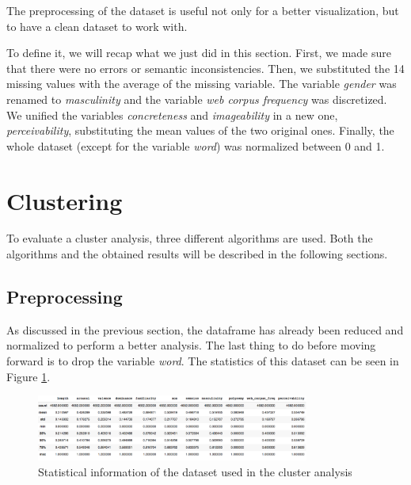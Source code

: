 \documentclass[a4paper,11pt,dvipsnames]{article}
\begin{document}
The preprocessing of the dataset is useful not only for a better visualization, but  to have a clean dataset to work with. 


To define it, we will recap what we just did in this section.
First, we made sure that there were no errors or semantic inconsistencies. Then, we substituted the 14 missing values with the average of the missing variable. The variable \textit{gender} was renamed to \textit{masculinity} and the variable \textit{web corpus frequency} was discretized. We unified the variables \textit{concreteness} and \textit{imageability} in a new one, \textit{perceivability}, substituting the mean values of the two original ones. Finally, the whole dataset (except for the variable \textit{word}) was normalized between 0 and 1.

\section{Clustering}

To evaluate a cluster analysis, three different algorithms are used. Both the algorithms and the obtained results will be described in the following sections.

\subsection{Preprocessing}
As discussed in the previous section, the dataframe has already been reduced and normalized to perform a better analysis. The last thing to do before moving forward is to drop the variable \textit{word}. The statistics of this dataset can be seen in Figure \ref{tab:stat2}.

\begin{figure}[h]
    \centering
    \includegraphics[width=0.8\textwidth]{stat2.png}
    \caption{Statistical information of the dataset used in the cluster analysis}
    \label{tab:stat2}
\end{figure}
\end{document}
